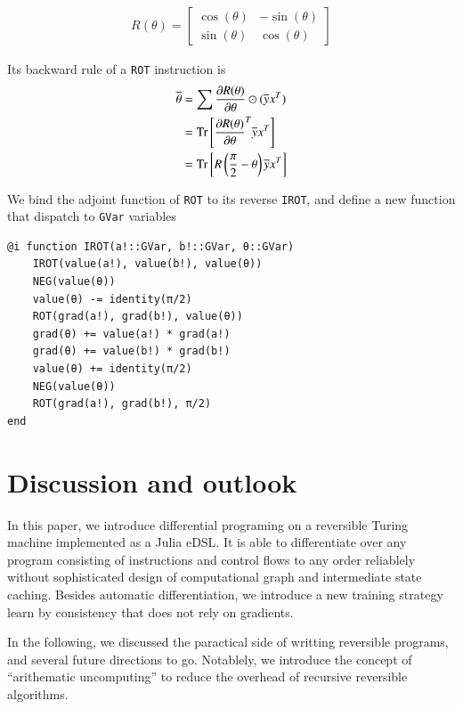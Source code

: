 \documentclass[aps,twocolumn,longbibliography,english,superscriptaddress,prr]{revtex4-1}
\newcommand{\<}{\langle}
\renewcommand{\>}{\rangle}
\newcommand{\Tr}{{\rm Tr}}
\theoremstyle{definition}\newtheorem{definition}{\textit{Definition}}
\begin{document}
\begin{align}
    R(\theta)  = \begin{bmatrix}
        \cos(\theta) & - \sin(\theta)\\
        \sin(\theta)  & \cos(\theta)
    \end{bmatrix}
\end{align}


Its backward rule of a \texttt{ROT} instruction is
\begin{align}
    \begin{split}
    \overline{\theta}  &= \sum\frac{\partial R(\theta)}{\partial \theta}\odot(\overline{y}x^T)\\
    &= \Tr\left[\frac{\partial R(\theta)}{\partial \theta}^T\overline{y}x^T\right]\\
    &= \Tr\left[R\left(\frac{\pi}{2}-\theta\right)\overline{y}x^T\right]
    \end{split}
\end{align}

We bind the adjoint function of \texttt{ROT} to its reverse \texttt{IROT},
and define a new function that dispatch to \texttt{GVar} variables

\begin{minipage}{.44\textwidth}
\begin{lstlisting}
@i function IROT(a!::GVar, b!::GVar, θ::GVar)
    IROT(value(a!), value(b!), value(θ))
    NEG(value(θ))
    value(θ) -= identity(π/2)
    ROT(grad(a!), grad(b!), value(θ))
    grad(θ) += value(a!) * grad(a!)
    grad(θ) += value(b!) * grad(b!)
    value(θ) += identity(π/2)
    NEG(value(θ))
    ROT(grad(a!), grad(b!), π/2)
end
\end{lstlisting}
\end{minipage}

\section{Discussion and outlook}\label{sec:discussion}
In this paper, we introduce differential programing on a reversible Turing machine implemented as a Julia eDSL.
It is able to differentiate over any program consisting of instructions and control flows to any order reliablely without sophisticated design of computational graph and intermediate state caching.
Besides automatic differentiation, we introduce a new training strategy learn by consistency that does not rely on gradients.

In the following, we discussed the paractical side of writting reversible programs, and several future directions to go.
Notablely, we introduce the concept of ``arithematic uncomputing'' to reduce the overhead of recursive reversible algorithms.
\end{document}

